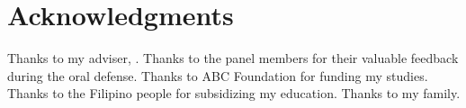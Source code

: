 \chapter{Acknowledgments}

Thanks to my adviser, \Adviser. Thanks to the panel members for their valuable feedback during the oral defense. Thanks to ABC Foundation for funding my studies. Thanks to the Filipino people for subsidizing my education. Thanks to my family.

